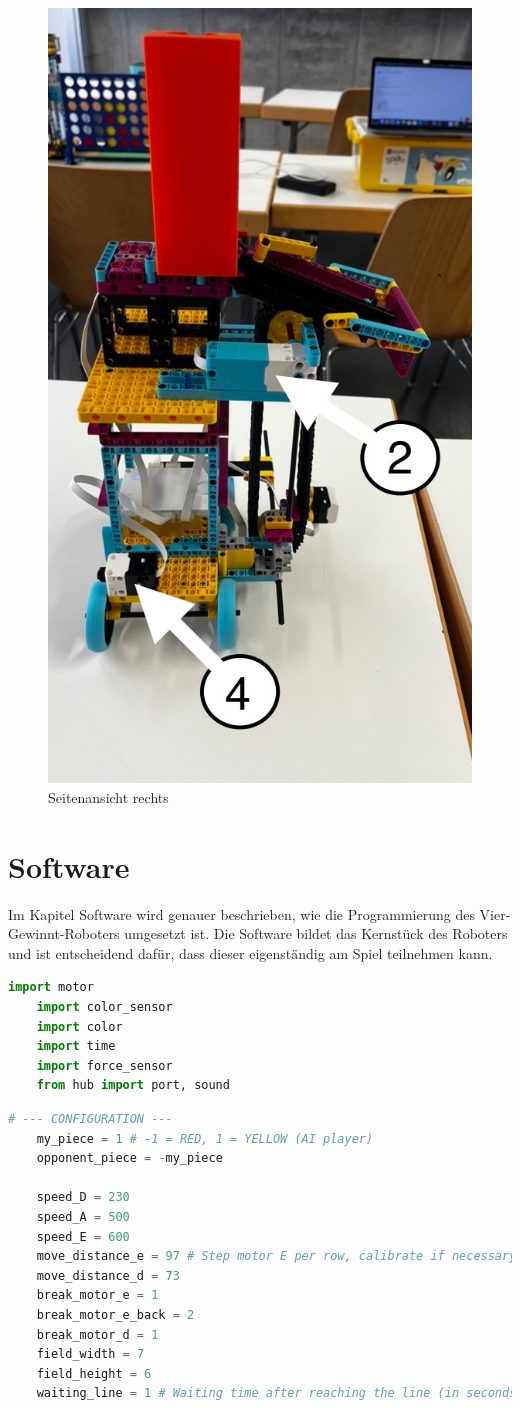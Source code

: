 \begin{figure}[H]
	\centering
	\includegraphics[width=0.5\linewidth]{images/DAE26A50-277E-4C6B-96A3-F2DE2CC9C004_1_105_c}
	\caption{Seitenansicht rechts}
	\label{fig:dae26a50-277e-4c6b-96a3-f2de2cc9c0041105c}
\end{figure}


\section{Software}
Im Kapitel Software wird genauer beschrieben, wie die Programmierung des Vier-Gewinnt-Roboters umgesetzt ist. Die Software bildet das Kernstück des Roboters und ist entscheidend dafür, dass dieser eigenständig am Spiel teilnehmen kann.

\begin{lstlisting}[language=Python]
	import motor
	import color_sensor
	import color
	import time
	import force_sensor
	from hub import port, sound
\end{lstlisting}

\begin{lstlisting}[language=Python]
	# --- CONFIGURATION ---
	my_piece = 1 # -1 = RED, 1 = YELLOW (AI player)
	opponent_piece = -my_piece
	
	speed_D = 230
	speed_A = 500
	speed_E = 600
	move_distance_e = 97 # Step motor E per row, calibrate if necessary!
	move_distance_d = 73
	break_motor_e = 1
	break_motor_e_back = 2
	break_motor_d = 1
	field_width = 7
	field_height = 6
	waiting_line = 1 # Waiting time after reaching the line (in seconds)
\end{lstlisting}


